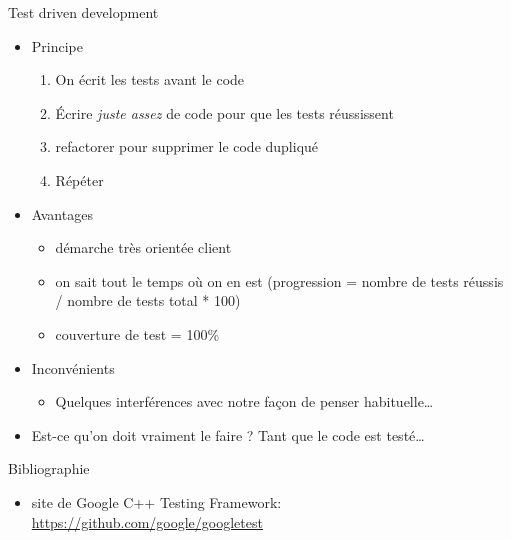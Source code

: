 \begin{frame}{Test driven development}

\begin{itemize}
\itemsep1pt\parskip0pt
\item
  Principe

  \begin{enumerate}
  \def\labelenumi{\arabic{enumi}.}
  \itemsep1pt\parskip0pt
  \item
    On écrit les tests avant le code
  \item
    Écrire \emph{juste assez} de code pour que les tests réussissent
  \item
    refactorer pour supprimer le code dupliqué
  \item
    Répéter
  \end{enumerate}
\item
  Avantages

  \begin{itemize}
  \itemsep1pt\parskip0pt
  \item
    démarche très orientée client
  \item
    on sait tout le temps où on en est (progression = nombre de tests
    réussis / nombre de tests total * 100)
  \item
    couverture de test = 100\%
  \end{itemize}
\item
  Inconvénients

  \begin{itemize}
  \itemsep1pt\parskip0pt
  \item
    Quelques interférences avec notre façon de penser habituelle\ldots{}
  \end{itemize}
\item
  Est-ce qu'on doit vraiment le faire ? Tant que le code est
  testé\ldots{}
\end{itemize}

\end{frame}

\begin{frame}{Bibliographie}

\begin{itemize}
\item
  site de Google C++ Testing Framework:
  \url{https://github.com/google/googletest}
\end{itemize}

\end{frame}


